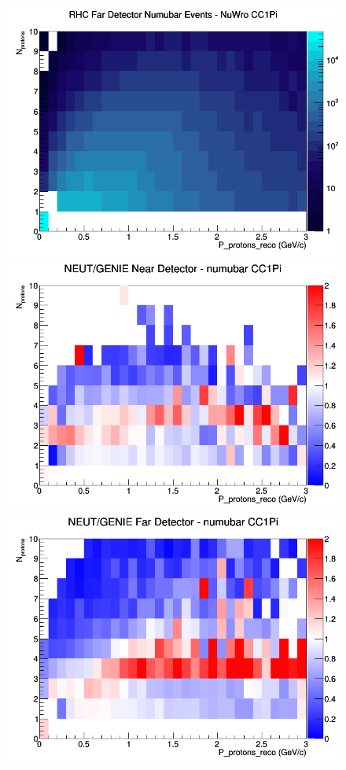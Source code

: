 \documentclass[12pt]{article}
\begin{document}
\begin{figure}[h]
\endminipage
{}
\includegraphics[width=\linewidth]{eff_N_P/FGT/protons/CC1Pi_RHC_FD_numubar_N_P_NuWro.png}
\endminipage
\newline
{}
\includegraphics[width=\linewidth]{eff_N_P/FGT/protons/ratios/CC1Pi_NEUT_GENIE_numubar_near_N_P.png}
\endminipage
{}
\includegraphics[width=\linewidth]{eff_N_P/FGT/protons/ratios/CC1Pi_NEUT_GENIE_numubar_far_N_P.png}

\end{figure}
\end{document}
